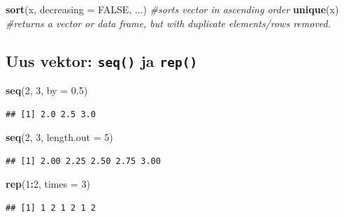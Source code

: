 \documentclass[]{book}
\newenvironment{Shaded}{\begin{snugshade}}{\end{snugshade}}
\newcommand{\KeywordTok}[1]{\textcolor[rgb]{0.13,0.29,0.53}{\textbf{#1}}}
\newcommand{\DataTypeTok}[1]{\textcolor[rgb]{0.13,0.29,0.53}{#1}}
\newcommand{\DecValTok}[1]{\textcolor[rgb]{0.00,0.00,0.81}{#1}}
\newcommand{\FloatTok}[1]{\textcolor[rgb]{0.00,0.00,0.81}{#1}}
\newcommand{\CommentTok}[1]{\textcolor[rgb]{0.56,0.35,0.01}{\textit{#1}}}
\newcommand{\OtherTok}[1]{\textcolor[rgb]{0.56,0.35,0.01}{#1}}
\newcommand{\OperatorTok}[1]{\textcolor[rgb]{0.81,0.36,0.00}{\textbf{#1}}}
\newcommand{\NormalTok}[1]{#1}
\begin{document}
\begin{Shaded}
\begin{Highlighting}[]
\KeywordTok{sort}\NormalTok{(x, }\DataTypeTok{decreasing =} \OtherTok{FALSE}\NormalTok{, ...) }\CommentTok{#sorts vector in ascending order}
\KeywordTok{unique}\NormalTok{(x) }\CommentTok{#returns a vector or data frame, but with duplicate elements/rows removed.}
\end{Highlighting}
\end{Shaded}

\subsection{\texorpdfstring{Uus vektor: \texttt{seq()} ja
\texttt{rep()}}{Uus vektor: seq() ja rep()}}\label{uus-vektor-seq-ja-rep}

\begin{Shaded}
\begin{Highlighting}[]
\KeywordTok{seq}\NormalTok{(}\DecValTok{2}\NormalTok{, }\DecValTok{3}\NormalTok{, }\DataTypeTok{by =} \FloatTok{0.5}\NormalTok{)}
\end{Highlighting}
\end{Shaded}

\begin{verbatim}
## [1] 2.0 2.5 3.0
\end{verbatim}

\begin{Shaded}
\begin{Highlighting}[]
\KeywordTok{seq}\NormalTok{(}\DecValTok{2}\NormalTok{, }\DecValTok{3}\NormalTok{, }\DataTypeTok{length.out =} \DecValTok{5}\NormalTok{)}
\end{Highlighting}
\end{Shaded}

\begin{verbatim}
## [1] 2.00 2.25 2.50 2.75 3.00
\end{verbatim}

\begin{Shaded}
\begin{Highlighting}[]
\KeywordTok{rep}\NormalTok{(}\DecValTok{1}\OperatorTok{:}\DecValTok{2}\NormalTok{, }\DataTypeTok{times =} \DecValTok{3}\NormalTok{)}
\end{Highlighting}
\end{Shaded}

\begin{verbatim}
## [1] 1 2 1 2 1 2
\end{verbatim}
\end{document}

